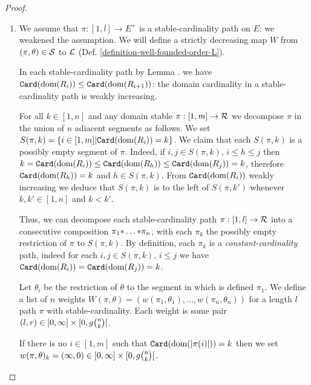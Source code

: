 \documentclass{lmcs}
\begin{document}
\begin{proof}
\begin{enumerate}
\item
We assume that $\pi:[1,l] \rightarrow E^+$ is a stable-cardinality
path on $E$: we weakened the  assumption.
 We will define a strictly decreasing map $W$ from
$(\pi,\theta) \in {\mathcal S}$ to ${\mathcal L}$ (Def. \ref{definition-well-founded-order-L}).

In each stable-cardinality path 
by Lemma 
\label{lemma-stable-cardinality-injective}.
\label{lemma-stable-cardinality-injective-01}
we have ${\tt Card}({\rm dom}(R_{i})) 
\le {\tt Card}({\rm dom}(R_{i+1}))$: the domain cardinality in a stable-cardinality path
is weakly increasing. 

For all $k \in [1,n]$ and any domain stable $ \pi :[1,m] \rightarrow {\mathcal R} $ 
we decompose $\pi$ in the union of $n$ adiacent segments as follows. We set
 $S(\pi,k) = \{i \in[1,m] | {\tt Card}({\rm dom}(R_i)) = k \}$. 
We claim that each $S(\pi,k)$ is a possibly empty segment of $\pi$. 
Indeed, if $i, j \in 
S(\pi,k)$, $i \le h \le j$ then $k = {\tt Card}({\rm dom}(R_i)) \le {\tt Card}({\rm dom}(R_h))
\le {\tt Card}({\rm dom}(R_j)) = k$, therefore ${\tt Card}({\rm dom}(R_h))=k$ and $h \in S(\pi,k)$.
From ${\tt Card}({\rm dom}(R_{i}))$ weakly increasing 
we deduce that $S(\pi,k)$ is to the left
of $S(\pi,k')$ whenever $k,k' \in [1,n]$ and $k < k'$.

Thus, we can decompose each stable-cardinality path 
$\pi:[1,l] \rightarrow {\mathcal R}$ into
a consecutive composition $\pi_1 {*} \ldots {*} \pi_n$, 
with each $\pi_k$ the possibly empty restriction of $\pi$ to $S(\pi,k)$.
By definition, each $\pi_k$ is a \emph{constant-cardinality} path,
indeed for each $i, j \in S(\pi,k)$, $i \le j$ we have 
${\tt Card}({\rm dom}(R_{i}))={\tt Card}({\rm dom}(R_{j}))=k$. 

Let $\theta_i$ be the restriction of $\theta$ to the segment in which is
defined $\pi_1$.
We define a list of $n$ weights $W(\pi,\theta) = (w(\pi_1, \theta_1),
\ldots, w(\pi_n, \theta_n))$ 
for a length $l$ path $\pi$ with stable-cardinality. Each weight
is some pair $(l,r) \in [0,\infty] \times [0,g\newton{n}{k}[$. 

If there is no $i \in[1,m]$ such that ${\tt Card}({\rm dom}({| \pi(i) |}))=k$
then we set $w(\pi,\theta)_k = (\infty,0)  
\in [0,\infty] \times [0,g\newton{n}{k}[$.


\end{enumerate}
\end{proof}
\end{document}

